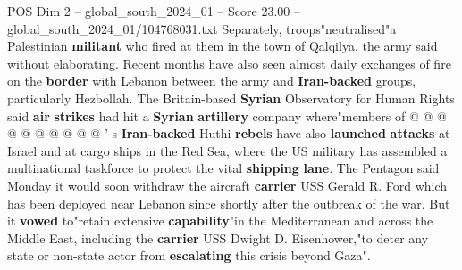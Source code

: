 \begin{textsample}{POS Dim 2 – global\_south\_2024\_01 – Score 23.00 – global\_south\_2024\_01/104768031.txt}
Separately, troops"neutralised"a Palestinian \textbf{militant} who fired at them in the town of Qalqilya, the army said without elaborating.
Recent months have also seen almost daily exchanges of fire on the \textbf{border} with Lebanon between the army and \textbf{Iran-backed} groups, particularly Hezbollah.
The Britain-based \textbf{Syrian} Observatory for Human Rights said \textbf{air} \textbf{strikes} had hit a \textbf{Syrian} \textbf{artillery} company where"members of @ @ @ @ @ @ @ @ @ @ ' s \textbf{Iran-backed} Huthi \textbf{rebels} have also \textbf{launched} \textbf{attacks} at Israel and at cargo ships in the Red Sea, where the US military has assembled a multinational taskforce to protect the vital \textbf{shipping} \textbf{lane}.
The Pentagon said Monday it would soon withdraw the aircraft \textbf{carrier} USS Gerald R.
Ford which has been deployed near Lebanon since shortly after the outbreak of the war.
But it \textbf{vowed} to"retain extensive \textbf{capability}"in the Mediterranean and across the Middle East, including the \textbf{carrier} USS Dwight D.
Eisenhower,"to deter any state or non-state actor from \textbf{escalating} this crisis beyond Gaza".

\end{textsample}
